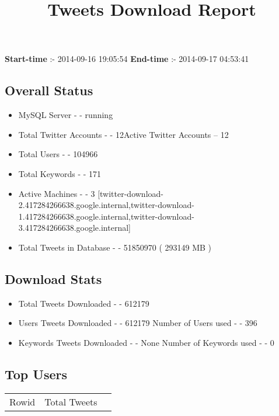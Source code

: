 \documentclass{article}\usepackage[T1]{fontenc}
\begin{document}
\title{\textbf{Tweets Download Report}}
               \date{}
                \maketitle
               \centerline{\textbf{Start-time} :- 2014-09-16 19:05:54 \hspace{40pt} \textbf{End-time} :- 2014-09-17 04:53:41}               \subsection*{Overall Status}                \begin{itemize}                \item MySQL Server - - running               \item Total Twitter Accounts - - 12\newline Active Twitter Accounts -- 12               \item Total Users - - 104966               \item Total Keywords - - 171               \item Active Machines - - 3 [twitter-download-2.417284266638.google.internal,twitter-download-1.417284266638.google.internal,twitter-download-3.417284266638.google.internal]               \item Total Tweets in Database - - 51850970 ( 293149 MB )               \end{itemize}               \subsection*{Download Stats}                \begin{itemize}                \item Total Tweets Downloaded - - 612179               \item Users Tweets Downloaded - - 612179 \newline Number of Users used - - 396               \item Keywords Tweets Downloaded - - None \newline Number of Keywords used - - 0              \end{itemize}              \subsection*{Top Users}\begin{tabular}{|c|c|c|}         \hline         Rowid & Total Tweets \\ 

\end{tabular}
\end{document}
